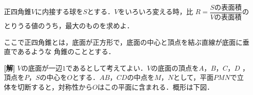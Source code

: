 \documentclass[a4j]{jarticle}
\begin{document}

     \begin{oframed}
     正四角錐$V$に内接する球を$S$とする．$V$をいろいろ変える時，比
     $R=\dfrac{S\text{の表面積}}{V\text{の表面積}}$のとりうる値のうち，最大のものを求めよ．
     
     ここで正四角錐とは，底面が正方形で，底面の中心と頂点を結ぶ直線が底面に垂直であるような
     角錐のこととする．
     \end{oframed}

\setlength{\columnseprule}{0.4pt}
\begin{multicols}{2}
{\bf[解]} $V$の底面が一辺$1$であるとして考えてよい．$V$の底面の頂点を$A$，$B$，$C$，$D$
，頂点を$P$，$S$の中心を$O$とする．$AB$，$CD$の中点を$M$，$N$として，平面$PMN$で立体を切断すると，対称性から$O$はこの平面に含まれる．概形は下図．
     
\newpage
\end{multicols}
\end{document}
